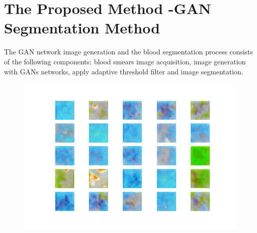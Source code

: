 \section{The Proposed Method -GAN Segmentation Method}
\label{segmethod}


The GAN network image generation and the blood segmentation process consists of the following components: blood smears image acquisition, image generation with GANs networks,  apply adaptive threshold filter and image segmentation.


\begin{figure}[h]
\begin{center}
\includegraphics[scale=0.3]{./images/generation/alta_mnist_50.png}    
\end{center}

\end{figure}



